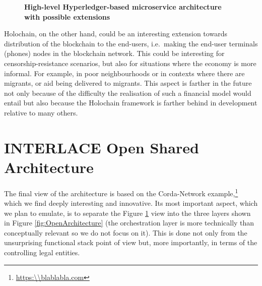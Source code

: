 \begin{figure}[h]
\centering
{}
\caption{\bf \small High-level Hyperledger-based microservice architecture with possible extensions}
\label{fig:HL_Architecture}
\end{figure}

Holochain, on the other hand, could be an interesting extension towards distribution of the blockchain to the end-users, i.e.\ making the end-user terminals (phones) nodes in the blockchain network. This could be interesting for censorship-resistance scenarios, but also for situations where the economy is more informal. For example, in poor neighbourhoods or in contexts where there are migrants, or aid being delivered to migrants. This aspect is farther in the future not only because of the difficulty the realisation of such a financial model would entail but also because the Holochain framework is farther behind in development relative to many others.

\section{INTERLACE Open Shared Architecture}
The final view of the architecture is based on the Corda-Network example,\footnote{\url{https:\\blablabla.com}} which we find deeply interesting and innovative. Its most important aspect, which we plan to emulate, is to separate the Figure \ref{fig:HL_Architecture} view into the three layers shown in Figure \ref{fig:OpenArchitecture} (the orchestration layer is more technically than conceptually relevant so we do not focus on it). This is done not only from the unsurprising functional stack point of view but, more importantly, in terms of the controlling legal entities.

